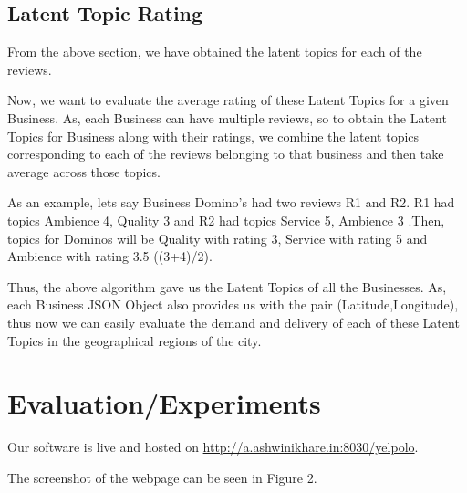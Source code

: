 \documentclass[12pt]{article} %
\begin{document}
\subsection{Latent Topic Rating}

From the above section, we have obtained the latent topics for each of the reviews.

Now, we want to evaluate the average rating of these Latent Topics for a given Business. As, each Business can have multiple reviews, so to obtain the Latent Topics for Business along with their ratings, we combine the latent topics corresponding to each of the reviews belonging to that business and then take average across those topics. 

As an example, lets say Business Domino's had two reviews R1 and R2. R1 had topics Ambience 4, Quality 3 and R2 had topics Service 5, Ambience 3 .Then, topics for Dominos will be Quality with rating 3, Service with rating 5 and Ambience with rating 3.5 ((3+4)/2). 
 
Thus, the above algorithm gave us the Latent Topics of all the Businesses. As, each Business JSON Object also provides us with the pair (Latitude,Longitude), thus now we can easily evaluate the demand and delivery of each of these Latent Topics in the geographical regions of the city.
 
%
%


\section{Evaluation/Experiments}

Our software is live and hosted on \href{http://a.ashwinikhare.in:8030/yelpolo}{http://a.ashwinikhare.in:8030/yelpolo}. 

The screenshot of the webpage can be seen in Figure 2.
\end{document}

